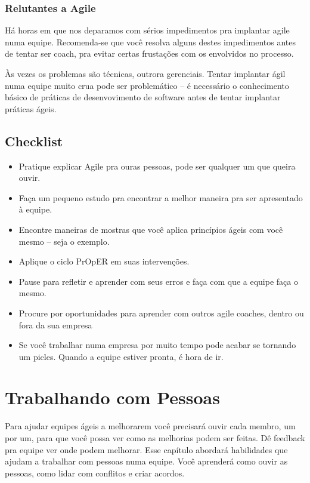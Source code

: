\documentclass[a4paper, 10pt, font=plain]{abnt}
\begin{document}
\subsection{Relutantes a Agile}
Há horas em que nos deparamos com sérios impedimentos pra implantar agile numa equipe. Recomenda-se que você resolva alguns destes impedimentos antes de tentar ser coach, pra evitar certas frustações com os envolvidos no processo.

Às vezes os problemas são técnicas, outrora gerenciais. Tentar implantar ágil numa equipe muito crua pode ser problemático -- é necessário o conhecimento básico de práticas de desenvovimento de software antes de tentar implantar práticas ágeis.

\section{Checklist}
\begin{itemize}
\item Pratique explicar Agile pra ouras pessoas, pode ser qualquer um que queira ouvir.
\item Faça um pequeno estudo pra encontrar a melhor maneira pra ser apresentado à equipe.
\item Encontre maneiras de mostras que você aplica princípios ágeis com você mesmo -- seja o exemplo.
\item Aplique o ciclo PrOpER em suas intervenções.
\item Pause para refletir e aprender com seus erros e faça com que a equipe faça o mesmo.
\item Procure por oportunidades para aprender com outros agile coaches, dentro ou fora da sua empresa
\item Se você trabalhar numa empresa por muito tempo pode acabar se tornando um picles. Quando a equipe estiver pronta, é hora de ir.
\end{itemize}



\chapter{Trabalhando com Pessoas}
Para ajudar equipes ágeis a melhorarem você precisará ouvir cada membro, um por um, para que você possa ver como as melhorias podem ser feitas. Dê feedback pra equipe ver onde podem melhorar.
Esse capítulo abordará habilidades que ajudam a trabalhar com pessoas numa equipe. Você aprenderá como ouvir as pessoas, como lidar com conflitos e criar acordos.
\end{document}
